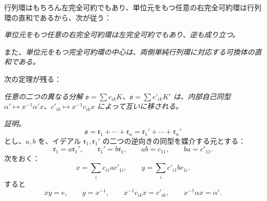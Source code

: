 \documentclass[11pt]{article}
\providecommand{\mo}{\mathfrak{o}}
\providecommand{\mr}{\mathfrak{r}}
\begin{document}
行列環はもちろん左完全可約でもあり、単位元をもつ任意の右完全可約環は行列環の直和であるから、次が従う：

\emph{単位元をもつ任意の右完全可約環は左完全可約でもあり、逆も成り立つ。}

また、\emph{単位元をもつ完全可約環の中心は、両側単純行列環に対応する可換体の直和である。}

次の定理が残る：

\emph{任意の二つの異なる分解 $\mo=\sum c_{ik}K$、$\mo=\sum c'_{ik}K'$ は、内部自己同型 $\alpha'\mapsto x^{-1}\alpha'x$、$c'_{ik}\mapsto x^{-1}c_{ik}x$ によって互いに移される。}

\emph{証明。} 
\[
        \mo=\mr_1+\cdots+\mr_n=\mr_1'+\cdots+\mr_n'
\]
とし、$a,b$ を、イデアル $\mr_1,\mr_1'$ の二つの逆向きの同型を媒介する元とする：
\[
        \mr_1=a\mr_1',
        \qquad
        \mr_1'=b\mr_1,
        \qquad
        ab=c_{11},
        \qquad
        ba=c'_{11}.
\]
次をおく：
\[
        x=\sum_i c_{i1}ac'_{1i},
        \qquad
        y=\sum_i c'_{i1}bc_{1i}.
\]
すると
\[
        xy=e,
        \qquad
        y=x^{-1},
        \qquad
        x^{-1}c_{ik}x=c'_{ik},
        \qquad
        x^{-1}\alpha x=\alpha'.
\]
\end{document}
